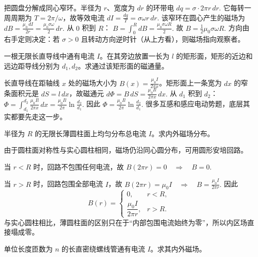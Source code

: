 \documentclass[lang=cn,11pt]{elegantbook}
\begin{document}
\begin{solution}
把圆盘分解成同心窄环。半径为 \(r\)、宽度为 \(dr\) 的环带电
 \(dq=\sigma\cdot 2\pi r\,dr.\) 
它每转一周周期为 \(T=2\pi/\omega\)，故等效电流
 \(dI=\frac{dq}{T}=\sigma\omega r\,dr.\) 
该窄环在圆心产生的磁场为
 \(dB=\frac{\mu_0\,dI}{2r} =\frac{\mu_0\sigma\omega}{2}\,dr.\) 
从 \(0\) 积到 \(R\)：
 \(B=\int_0^R dB =\frac{\mu_0\sigma\omega R}{2}.\) 
故
 \(\boxed{ B=\frac12\mu_0\sigma\omega R }.\) 
方向由右手定则决定：若 \(\sigma>0\) 且转动方向逆时针（从上方看），则磁场指向观察者。
\end{solution}

\begin{exercise}[长直导线穿过矩形面积的磁通量]
一根无限长直导线中通有电流 \(I\)。在其旁边放置一长为 \(l\) 的矩形面，矩形的近边和远边距导线分别为 \(d_1,d_2\)。求通过该矩形面的磁通量。
\end{exercise}

\begin{solution}
长直导线在距轴线 \(x\) 处的磁场大小为 \(B(x)=\frac{\mu_0I}{2\pi x}\)。矩形面上一条宽为 \(dx\) 的窄条面积元是 \(dS=l\,dx\)，故磁通元
 \(d\Phi=B\,dS=\frac{\mu_0Il}{2\pi x}\,dx.\) 
从 \(d_1\) 积到 \(d_2\)：
 \(\Phi=\int_{d_1}^{d_2}\frac{\mu_0Il}{2\pi x}\,dx =\frac{\mu_0Il}{2\pi}\ln\frac{d_2}{d_1}.\) 
因此
 \(\boxed{ \Phi=\frac{\mu_0Il}{2\pi}\ln\frac{d_2}{d_1} }.\) 
很多互感和感应电动势题，底层其实都要先走这一步。
\end{solution}

\begin{exercise}[无限长载流圆柱面的磁场]
半径为 \(R\) 的无限长薄圆柱面上均匀分布总电流 \(I\)。求内外磁场分布。
\end{exercise}

\begin{solution}
由于圆柱面对称性与实心圆柱相同，磁场仍沿同心圆分布，可用圆形安培回路。

当 \(r<R\) 时，回路不包围任何电流，故
 \(B(2\pi r)=0 \quad\Longrightarrow\quad B=0.\) 

当 \(r>R\) 时，回路包围全部电流 \(I\)，故
 \(B(2\pi r)=\mu_0I \quad\Longrightarrow\quad B=\frac{\mu_0I}{2\pi r}.\) 
因此
\[
\boxed{
B(r)=
\begin{cases}
0, & r<R,\\[4pt]
\dfrac{\mu_0I}{2\pi r}, & r>R.
\end{cases}}
\]
与实心圆柱相比，薄圆柱面的区别只在于“内部包围电流始终为零”，所以内区场直接塌成零。
\end{solution}

\begin{exercise}[长直密绕螺线管的磁场]
单位长度匝数为 \(n\) 的长直密绕螺线管通有电流 \(I\)。求其内外磁场。
\end{exercise}
\end{document}
